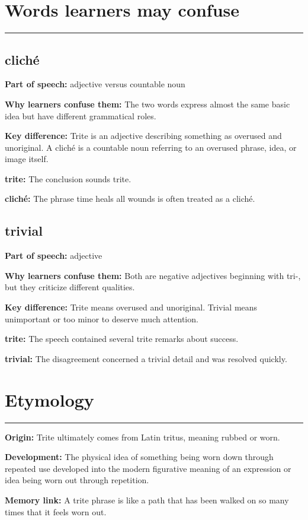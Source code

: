 \documentclass[11pt]{article}
\newcommand{\sectionrule}{\par\vspace{-0.5em}\noindent\textcolor{Accent}{\rule{\linewidth}{0.6pt}}\par}
\begin{document}
\section{Words learners may confuse}
\sectionrule
\subsection{cliché}
\textbf{Part of speech:} adjective versus countable noun

\textbf{Why learners confuse them:} The two words express almost the same basic idea but have different grammatical roles.

\textbf{Key difference:} Trite is an adjective describing something as overused and unoriginal. A cliché is a countable noun referring to an overused phrase, idea, or image itself.

\textbf{trite:} The conclusion sounds trite.

\textbf{cliché:} The phrase time heals all wounds is often treated as a cliché.

\subsection{trivial}
\textbf{Part of speech:} adjective

\textbf{Why learners confuse them:} Both are negative adjectives beginning with tri-, but they criticize different qualities.

\textbf{Key difference:} Trite means overused and unoriginal. Trivial means unimportant or too minor to deserve much attention.

\textbf{trite:} The speech contained several trite remarks about success.

\textbf{trivial:} The disagreement concerned a trivial detail and was resolved quickly.

\section{Etymology}
\sectionrule
\textbf{Origin:} Trite ultimately comes from Latin tritus, meaning rubbed or worn.

\textbf{Development:} The physical idea of something being worn down through repeated use developed into the modern figurative meaning of an expression or idea being worn out through repetition.

\textbf{Memory link:} A trite phrase is like a path that has been walked on so many times that it feels worn out.
\end{document}
